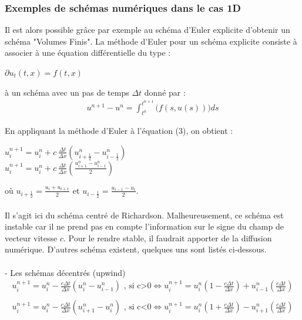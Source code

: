 \documentclass[12pt]{article}
\begin{document}
\subsubsection{Exemples de schémas numériques dans le cas 1D}

\noindent Il est alors possible grâce par exemple au schéma d'Euler explicite d'obtenir un schéma "Volumes Finis".
La méthode d'Euler pour un schéma explicite consiste à associer à une équation différentielle du type :
\begin{center}
        $\partial u_t(t,x)=f(t,x)$
\end{center}
à un schéma avec un pas de temps $\Delta t$ donné par :
\begin{eqnarray}
        u^{n+1}-u^{n} =  \int_{t^{n}}^{t^{n+1}}\big(f(s,u(s)))ds
\end{eqnarray}

\newpage \noindent En appliquant la méthode d'Euler à l'équation (3), on obtient :

\begin{center}
        $u^{n+1}_i=u_i^n + \displaystyle c \, \frac{\Delta t}{\Delta x}(u_{i+\frac{1}{2}}^n-u_{i-\frac{1}{2}}^n)$
        \\
        $u^{n+1}_i=u_i^n +  \displaystyle c \, \frac{\Delta t}{\Delta x}\left(\frac{u_{i+1}^n-u_{i-1}^n}{2}\right)$
\end{center}

\noindent où $u_{i+\frac{1}{2}} = \displaystyle\frac{u_i+u_{i+1}}{2}$ \: et \: $u_{i-\frac{1}{2}} = \displaystyle\frac{u_{i-1}-u_{i}}{2}$.
\\
\\
\noindent Il s'agit ici du schéma centré de Richardson. Malheureusement, ce schéma est instable car il ne prend pas en compte l'information sur le signe du champ de vecteur vitesse $c$. Pour le rendre stable, il faudrait apporter de la diffusion numérique.
D'autres schéma existent, quelques uns sont listés ci-dessous.
\\
\\- Les schémas décentrés (upwind)
\begin{eqnarray*}
        u^{n+1}_i=u_i^n-\frac{c\Delta t}{\Delta x}({u_{i}^n-u_{i-1}^n}) \text{       , si c>0}
        \iff u^{n+1}_i=u_i^n(1-\frac{c\Delta t}{\Delta x})+u_{i-1}^n(\frac{c\Delta t}{\Delta x})	
        \\
        \\
        u^{n+1}_i=u_i^n-\frac{c\Delta t}{\Delta x}({u_{i+1}^n-u_{i}^n}) \text{       , si c<0}
        \iff u^{n+1}_i=u_i^n(1+\frac{c\Delta t}{\Delta x})-u_{i+1}^n(\frac{c\Delta t}{\Delta x})
\end{eqnarray*}
\end{document}
